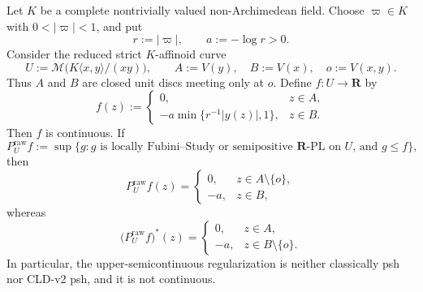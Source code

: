 \begin{proposition}
\label{prop:ch15-nodal-local-envelope}
Let \(K\) be a complete nontrivially valued non-Archimedean field.  Choose
\(\varpi\in K\) with \(0<|\varpi|<1\), and put
\[
                  r:=|\varpi|,
          \qquad  a:=-\log r>0.
\]
Consider the reduced strict \(K\)-affinoid curve
\[
 U:=\mathcal M\bigl(K\langle x,y\rangle/(xy)\bigr),
 \qquad
 A:=V(y),\quad B:=V(x),\quad o:=V(x,y).
\]
Thus \(A\) and \(B\) are closed unit discs meeting only at \(o\).  Define
\(f:U\to\mathbf R\) by
\begin{equation}
\label{eq:ch15-nodal-obstacle}
 f(z):=
 \begin{cases}
  0,
       & z\in A,\\[2mm]
  -a\min\{r^{-1}|y(z)|,1\},
       & z\in B.
 \end{cases}
\end{equation}
Then \(f\) is continuous.  If
\[
 P_U^{\mathrm{raw}}f
 :=\sup\{g:g\text{ is locally Fubini--Study or semipositive
                    \(\mathbf R\)-PL on \(U\), and }g\leq f\},
\]
then
\begin{equation}
\label{eq:ch15-nodal-raw-envelope}
 P_U^{\mathrm{raw}}f(z)=
 \begin{cases}
  0,  &z\in A\setminus\{o\},\\
  -a, &z\in B,
 \end{cases}
\end{equation}
whereas
\begin{equation}
\label{eq:ch15-nodal-regularized-envelope}
 \bigl(P_U^{\mathrm{raw}}f\bigr)^*(z)=
 \begin{cases}
  0,  &z\in A,\\
  -a, &z\in B\setminus\{o\}.
 \end{cases}
\end{equation}
In particular, the upper-semicontinuous regularization is neither
classically psh nor CLD-v2 psh, and it is not continuous.
\end{proposition}

